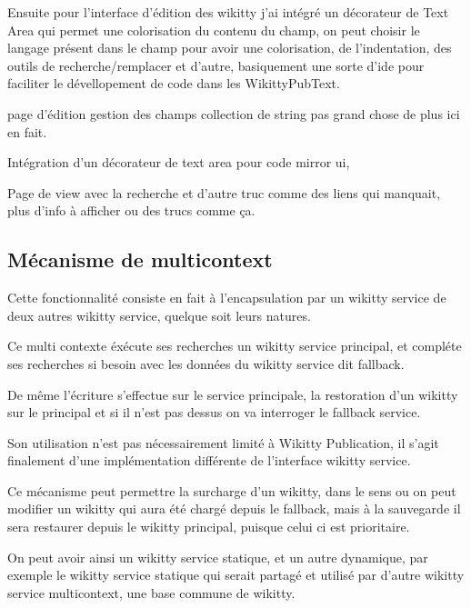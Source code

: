 Ensuite pour l'interface d'édition des wikitty j'ai intégré un décorateur de
Text Area qui permet une colorisation du contenu du champ, on peut choisir le
langage présent dans le champ pour avoir une colorisation, de l'indentation, des
outils de recherche/remplacer et d'autre, basiquement une sorte d'ide pour
faciliter le dévellopement de code dans les WikittyPubText.




page d'édition gestion des champs collection de string
pas grand chose de plus ici en fait.

Intégration d'un décorateur de text area pour code mirror ui, 

 

Page de view avec la recherche et d'autre truc
comme des liens qui manquait, plus d'info à afficher ou des trucs comme ça.




\subsection{Mécanisme de multicontext}

Cette fonctionnalité consiste en fait à l'encapsulation par un wikitty service
de deux autres wikitty service, quelque soit leurs natures.

Ce multi contexte éxécute ses recherches un wikitty service principal, et
compléte ses recherches si besoin avec les données du wikitty service dit
fallback.

De même l'écriture s'effectue sur le service principale, la restoration d'un
wikitty sur le principal et si il n'est pas dessus on va interroger le fallback
service.


Son utilisation n'est pas nécessairement limité à Wikitty Publication, il s'agit
finalement d'une implémentation différente de l'interface wikitty service. 

Ce mécanisme peut permettre la surcharge d'un wikitty, dans le sens ou on peut
modifier un wikitty qui aura été chargé depuis le fallback, mais à la sauvegarde
il sera restaurer depuis le wikitty principal, puisque celui ci est prioritaire.

On peut avoir ainsi un wikitty service statique, et un autre dynamique, par
exemple le wikitty service statique qui serait partagé et utilisé par d'autre
wikitty service multicontext, une base commune de wikitty.


